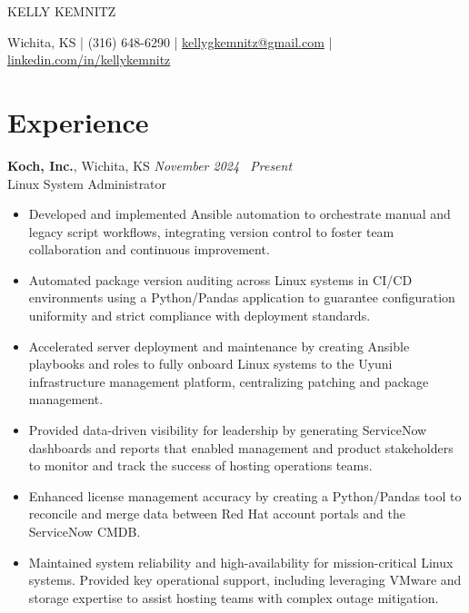 \documentclass[10pt]{article}       %
\begin{document}
\centerline{\Huge KELLY KEMNITZ}

\vspace{5pt}

\centerline{\large Wichita, KS | (316) 648-6290 | \href{mailto:kellygkemnitz@gmail.com}{kellygkemnitz@gmail.com} | \href{https://www.linkedin.com/in/kellykemnitz/}{linkedin.com/in/kellykemnitz}}

\vspace{-10pt}

\section*{Experience}
\textbf{Koch, Inc.}, Wichita, KS \hfill \textit{November 2024 \textendash\ Present} \\
\vspace{1pt}
Linux System Administrator \\
\begin{itemize}
  \item Developed and implemented Ansible automation to orchestrate manual and legacy script workflows, integrating version control to foster team collaboration and continuous improvement.
  \item Automated package version auditing across Linux systems in CI/CD environments using a Python/Pandas application to guarantee configuration uniformity and strict compliance with deployment standards.
  \item Accelerated server deployment and maintenance by creating Ansible playbooks and roles to fully onboard Linux systems to the Uyuni infrastructure management platform, centralizing patching and package management.
  \item Provided data-driven visibility for leadership by generating ServiceNow dashboards and reports that enabled management and product stakeholders to monitor and track the success of hosting operations teams.
  \item Enhanced license management accuracy by creating a Python/Pandas tool to reconcile and merge data between Red Hat account portals and the ServiceNow CMDB.
  \item Maintained system reliability and high-availability for mission-critical Linux systems. Provided key operational support, including leveraging VMware and storage expertise to assist hosting teams with complex outage mitigation.
\end{itemize}
\end{document}
